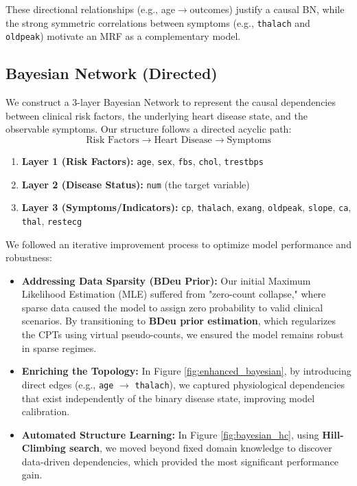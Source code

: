 \documentclass{article}
\begin{document}
These directional relationships (e.g., age$\rightarrow$outcomes) justify a causal BN, while the strong symmetric correlations between symptoms (e.g., \texttt{thalach} and \texttt{oldpeak}) motivate an MRF as a complementary model.


\subsection{Bayesian Network (Directed)}

We construct a 3-layer Bayesian Network to represent the causal dependencies between clinical risk factors, the underlying heart disease state, and the observable symptoms. Our structure follows a directed acyclic path:
\begin{equation}
    \text{Risk Factors} \rightarrow \text{Heart Disease} \rightarrow \text{Symptoms}
\end{equation}

\begin{enumerate}
\item \textbf{Layer 1 (Risk Factors):} \texttt{age}, \texttt{sex}, \texttt{fbs}, \texttt{chol}, \texttt{trestbps}
\item \textbf{Layer 2 (Disease Status):} \texttt{num} (the target variable)
\item \textbf{Layer 3 (Symptoms/Indicators):} \texttt{cp}, \texttt{thalach}, \texttt{exang}, \texttt{oldpeak}, \texttt{slope}, \texttt{ca}, \texttt{thal}, \texttt{restecg}
\end{enumerate}

We followed an iterative improvement process to optimize model performance and robustness:
\begin{itemize}
    \item \textbf{Addressing Data Sparsity (BDeu Prior):} Our initial Maximum Likelihood Estimation (MLE) suffered from "zero-count collapse," where sparse data caused the model to assign zero probability to valid clinical scenarios. By transitioning to \textbf{BDeu prior estimation}, which regularizes the CPTs using virtual pseudo-counts, we ensured the model remains robust in sparse regimes.
    \item \textbf{Enriching the Topology:} In Figure \ref{fig:enhanced_bayesian}, by introducing direct edges (e.g., \texttt{age} $\rightarrow$ \texttt{thalach}), we captured physiological dependencies that exist independently of the binary disease state, improving model calibration.
    \item \textbf{Automated Structure Learning:} In Figure \ref{fig:bayesian_hc}, using \textbf{Hill-Climbing search}, we moved beyond fixed domain knowledge to discover data-driven dependencies, which provided the most significant performance gain.
\end{itemize}
\end{document}
